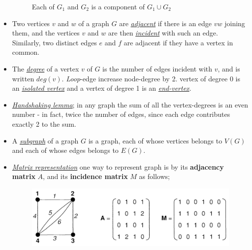 \documentclass[12pt,a4paper, twocolumn]{article}
\begin{document}
\begin{itemize}
\begin{figure}[h!]
	\caption{Each of $G_1$ and $G_2$ is a component of $G_1 \cup G_2$}
	\end{figure}
\item Two vertices $v$ and $w$ of a graph $G$ are \underline{\emph{\color{magenta} adjacent}} if there is an edge $vw$ joining them, and the vertices $v$ and $w$ are then \underline{\emph{\color{magenta} incident}} with such an edge. Similarly, two distinct edges $e$ and $f$ are adjacent if they have a vertex in common.
\item The \underline{\emph{\color{magenta} degree}} of a vertex $v$ of $G$ is the number of edges incident with $v$, and is written $deg(v)$. \emph{Loop}-edge increase node-degree by 2. vertex of degree 0 is an \underline{\emph{\color{magenta} isolated vertex}} and a vertex of degree 1 is an \underline{\emph{\color{magenta} end-vertex}}.
\item \underline{\emph{\color{magenta}Handshaking lemma}}; in any graph the sum of all the vertex-degrees is an even number - in fact, twice the number of edges, since each edge contributes exactly 2 to the sum.
\item A \underline{\emph{\color{magenta}subgraph}} of a graph $G$ is a graph, each of whose vertices belongs to $V(G)$ and each
of whose edges belongs to $E(G)$.
\item \underline{\emph{\color{magenta} Matrix representation}} one way to represent graph is by its \textbf{adjacency matrix} $A$, and its \textbf{incidence matrix} $M$ as follows;
	\begin{figure}[h!]
	\centering
	\includegraphics[scale=0.55]{figures/matrixRepresentation.png}
	\end{figure}
\end{itemize}
\newpage
\end{document}
